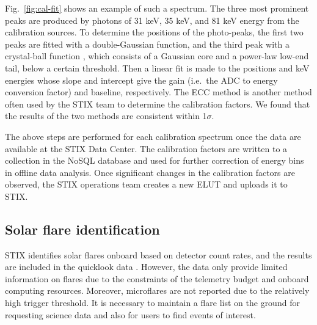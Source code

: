 \documentclass[referee]{aa} %
\begin{document}
Fig.~\ref{fig:cal-fit} shows an example of such a spectrum.  The three most prominent peaks are produced by photons of 31 keV, 35 keV, and 81 keV energy from the calibration sources. To determine the positions of the photo-peaks, the first two peaks are fitted with a double-Gaussian function, and the third peak with a crystal-ball function \citep{crsystallball},
which consists of a Gaussian core 
and a power-law low-end tail, below a certain threshold.
Then a linear fit is made to the positions and keV energies whose slope and intercept give the gain (i.e.\ the ADC to energy conversion factor) and baseline, respectively.
The ECC method \cite[see ][]{ecc,ecc2} is another method often used by the STIX team to determine the calibration factors.  We found that the results of the two methods are consistent within 1$\sigma$.

The above steps are performed for each calibration spectrum once the data are available at the STIX Data Center. 
The calibration factors are written to a collection in the NoSQL database and used for further correction of energy bins in offline data analysis.   
Once significant changes in the calibration factors are observed, the STIX operations team creates a new ELUT and uploads it to STIX.

\subsection{Solar flare identification}
STIX identifies solar flares onboard based on detector count rates, and the results are included in the quicklook data \citep{stix2020}.  However, the data only provide limited information on flares due to the constraints of the telemetry budget and onboard computing resources.  Moreover, microflares are not reported due to the relatively high trigger threshold.
It is necessary to maintain a flare list on the ground for requesting science data and also for users to find events of interest. 
\end{document}

